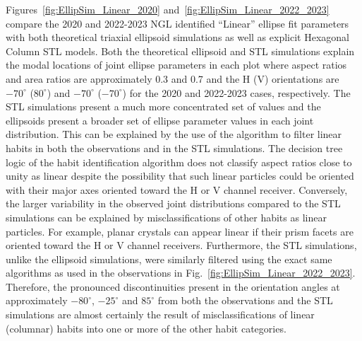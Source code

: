 \documentclass[amt, manuscript]{copernicus}
\begin{document}
Figures~\ref{fig:EllipSim_Linear_2020} and~\ref{fig:EllipSim_Linear_2022_2023} compare the 2020 and 2022-2023 NGL \citet{Schima2024} identified ``Linear'' ellipse fit parameters with both theoretical triaxial ellipsoid simulations as well as explicit Hexagonal Column STL models. Both the theoretical ellipsoid and STL simulations explain the modal locations of joint ellipse parameters in each plot where aspect ratios and area ratios are approximately 0.3 and 0.7 and the H (V) orientations are $-70^{\circ}$ ($80^{\circ}$) and $-70^{\circ}$ ($-70^{\circ}$) for the 2020 and 2022-2023 cases, respectively. The STL simulations present a much more concentrated set of values and the ellipsoids present a broader set of ellipse parameter values in each joint distribution. This can be explained by the use of the \citet{Schima2024} algorithm to filter linear habits in both the observations and in the STL simulations. The decision tree logic of the habit identification algorithm does not classify aspect ratios close to unity as linear despite the possibility that such linear particles could be oriented with their major axes oriented toward the H or V channel receiver. Conversely, the larger variability in the observed joint distributions compared to the STL simulations can be explained by misclassifications of other habits as linear particles. For example, planar crystals can appear linear if their prism facets are oriented toward the H or V channel receivers. Furthermore, the STL simulations, unlike the ellipsoid simulations, were similarly filtered using the exact same \citet{Schima2024} algorithms as used in the observations in Fig.~\ref{fig:EllipSim_Linear_2022_2023}. Therefore, the pronounced discontinuities present in the orientation angles at approximately $-80^{\circ}$, $-25^{\circ}$ and $85^{\circ}$ from both the observations and the STL simulations are almost certainly the result of misclassifications of linear (columnar) habits into one or more of the other \citet{Schima2024} habit categories.
\end{document}
